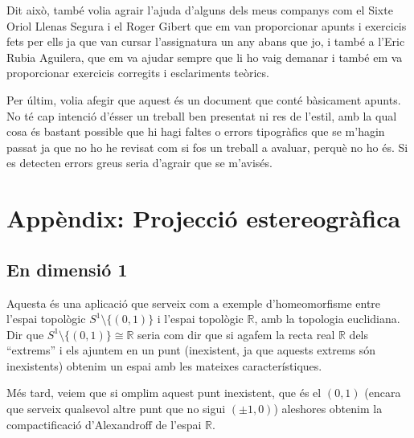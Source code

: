 \documentclass[../main.tex]{subfiles}
\begin{document}
Dit això, també volia agrair l'ajuda d'alguns dels meus companys com el Sixte Oriol Llenas Segura i el Roger Gibert que em van proporcionar apunts i exercicis fets per ells ja que van cursar l'assignatura un any abans que jo, i també a l'Eric Rubia Aguilera, que em va ajudar sempre que li ho vaig demanar i també em va proporcionar exercicis corregits i esclariments teòrics.

Per últim, volia afegir que aquest és un document que conté bàsicament apunts. No té cap intenció d'ésser un treball ben presentat ni res de l'estil, amb la qual cosa és bastant possible que hi hagi faltes o errors tipogràfics que se m'hagin passat ja que no ho he revisat com si fos un treball a avaluar, perquè no ho és. Si es detecten errors greus seria d'agrair que se m'avisés.












\chapter{Appèndix: Projecció estereogràfica}















\section{En dimensió 1}

Aquesta és una aplicació que serveix com a exemple d'homeomorfisme entre l'espai topològic $S^1\setminus\{(0,1)\}$ i l'espai topològic $\mathbb{R}$, amb la topologia euclidiana. Dir que $S^1\setminus\{(0,1)\}\cong \mathbb{R}$ seria com dir que si agafem la recta real $\mathbb{R}$ dels ``extrems'' i els ajuntem en un punt (inexistent, ja que aquests extrems són inexistents) obtenim un espai amb les mateixes característiques.

Més tard, veiem que si omplim aquest punt inexistent, que és el $(0,1)$ (encara que serveix qualsevol altre punt que no sigui $(\pm 1,0)$) aleshores obtenim la compactificació d'Alexandroff de l'espai $\mathbb{R}$.
\end{document}
